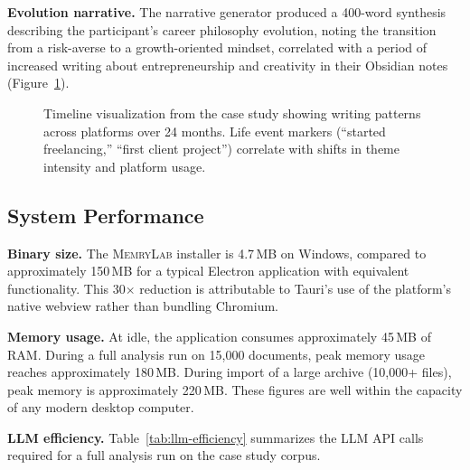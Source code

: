 \documentclass[manuscript,review]{acmart}
\begin{document}
\textbf{Evolution narrative.}
The narrative generator produced a 400-word synthesis describing the participant's career philosophy evolution, noting the transition from a risk-averse to a growth-oriented mindset, correlated with a period of increased writing about entrepreneurship and creativity in their Obsidian notes (Figure~\ref{fig:case-study}).

\begin{figure}[t]
  \centering
  \caption{Timeline visualization from the case study showing writing patterns across platforms over 24 months. Life event markers (``started freelancing,'' ``first client project'') correlate with shifts in theme intensity and platform usage.}
  \label{fig:case-study}
\end{figure}

\subsection{System Performance}
\label{sec:system-perf}

\textbf{Binary size.}
The \textsc{MemryLab} installer is 4.7\,MB on Windows, compared to approximately 150\,MB for a typical Electron application with equivalent functionality.
This 30$\times$ reduction is attributable to Tauri's use of the platform's native webview rather than bundling Chromium.

\textbf{Memory usage.}
At idle, the application consumes approximately 45\,MB of RAM.
During a full analysis run on 15,000 documents, peak memory usage reaches approximately 180\,MB.
During import of a large archive (10,000+ files), peak memory is approximately 220\,MB.
These figures are well within the capacity of any modern desktop computer.

\textbf{LLM efficiency.}
Table~\ref{tab:llm-efficiency} summarizes the LLM API calls required for a full analysis run on the case study corpus.
\end{document}

